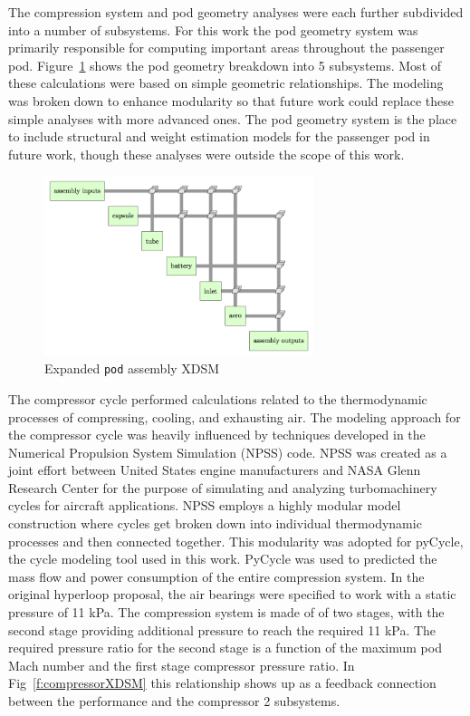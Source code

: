 \documentclass[heading.tex]{subfiles}
\begin{document}
The compression system and pod geometry analyses were each further subdivided into a number of subsystems. For this work the pod geometry 
system was primarily responsible for computing important areas throughout the passenger pod. Figure~\ref{f:podXDSM} shows the 
pod geometry breakdown into 5 subsystems. Most of these calculations were based on simple geometric relationships. The 
modeling was broken down to enhance modularity so that future work could replace these simple analyses with more advanced ones.
The pod geometry system is the place to include structural and weight estimation models for the passenger pod in future work,
though these analyses were outside the scope of this work. 

\begin{figure}[hbtp]
\centering
\includegraphics[width=0.7\textwidth]{images/pod_assembly_xdsm.png}
\caption{Expanded \texttt{pod} assembly XDSM}
\label{f:podXDSM}
\end{figure}

The compressor cycle performed calculations related to the thermodynamic processes of compressing, cooling, and exhausting air. 
The modeling approach for the compressor cycle was heavily influenced by techniques developed in the Numerical Propulsion System Simulation (NPSS) code. 
NPSS was created as a joint effort between United States engine manufacturers and NASA Glenn Research Center for the purpose of 
simulating and analyzing turbomachinery cycles for aircraft applications\cite{Lytle}. NPSS employs a highly modular model construction
where cycles get broken down into individual thermodynamic processes and then connected together. This modularity was adopted for pyCycle, 
the cycle modeling tool used in this work. PyCycle was used to predicted the mass flow and power consumption of the entire compression system. 
In the original hyperloop proposal, the air bearings were specified to work with a static pressure of 11 kPa. The compression system is made of 
of two stages, with the second stage providing additional pressure to reach the required 11 kPa. The required pressure ratio for the second stage
is a function of the maximum pod Mach number and the first stage compressor pressure ratio. In Fig~\ref{f:compressorXDSM} this relationship 
shows up as a feedback connection between the performance and the compressor 2 subsystems. 
\end{document}
